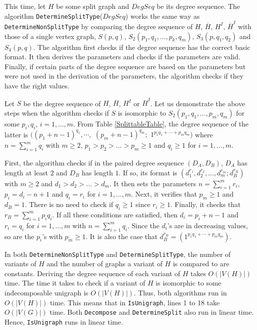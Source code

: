 \documentclass[11pt]{article}
\begin{document}
This time, let $H$ be some split  graph and $\mathit{DegSeq}$ be its degree sequence.  The algorithm {\tt DetermineSplitType}($\mathit{DegSeq}$) works the same way as {\tt DetermineNonSplitType} by comparing the degree sequence of $H$, $\overline{H}$, $H^I$, $\overline{H}^I$ with those of a single vertex graph, $S(p,q)$, $S_2(p_1, q_1, \hdots, p_k, q_m)$, $S_3(p, q_1, q_2)$ and $S_4(p,q)$.   The algorithm first checks if the degree sequence has the correct basic format.  It then derives the parameters and checks if the parameters are valid.  Finally, if certain parts of the degree sequence are based on the parameters but were not used in the derivation of the parameters,  the algorithm checks if they have the right values.  
 
 Let $S$ be the degree sequence of $H$, $\overline{H}$, $H^I$ or $\overline{H}^I$.  Let us demonstrate the above steps when the algorithm checks if $S$ is isomorphic to   $S_2(p_1, q_1, \hdots, p_m, q_m)$ for some $p_i, q_i$, $i = 1, \hdots, m$.  From Table \ref{SplittableTable}, the degree sequence of the latter is $((p_1+ n -1)^{q_1}, \cdots, $ $(p_m + n-1)^{q_m};$ $1^{p_1q_1 + \cdots + p_m q_m})$ where $n = \sum_{i=1}^m q_i$ with $m \ge 2$, $p_1 > p_2 > \hdots > p_m \ge 1$ and $q_i \ge 1$ for $i = 1, \hdots, m$.  
 
 First, the algorithm checks if in the paired degree sequence $(D_A, D_B)$,  $D_A$ has length at least $2$ and $D_B$ has length $1$.   If so, its format is  $(d_1^{r_1}, d_2^{r_2}, \dots, d_m^{r_m}; d_B^{r_B})$ with $m \ge 2$ and $d_1 > d_2 > \hdots > d_m$.  It then sets the parameters $n = \sum_{i=1}^m r_i$,  $p_i = d_i - n+1$ and $q_i = r_i$ for $i = 1, \hdots, m$.   Next, it verifies that $p_m \ge 1$ and $d_B = 1$.  There is no need to check if $q_i \ge 1$ since $r_i \ge 1$. 
 Finally, it checks that $r_B = \sum_{i=1}^m p_i q_i$.    If all these conditions are satisfied, then $d_i = p_i + n -1$ and $r_i = q_i$ for $i = 1, \hdots, m$ with $n = \sum_{i=1}^m q_i$.   Since the $d_i$'s are in decreasing values, so are the  $p_i$'s with $p_m \ge 1$.   It is also the case that $d_B^{r_B} = (1^{p_1q_1 + \cdots + p_m q_m})$. 
 
 
 In both {\tt DetermineNonSplitType} and {\tt DetermineSplitType}, the number of variants of $H$ and the number of graphs a variant of $H$ is compared to are constants.  Deriving the degree sequence of each variant of $H$ takes $O(|V(H)|)$ time. The time it takes to check if a variant of $H$ is isomorphic to some indecomposable unigraph is $O(|V(H)|)$.  Thus, both algorithms run in $O(|V(H)|)$ time.  This means that in {\tt IsUnigraph},  lines 1 to 18 take $O(|V(G)|)$ time.  Both {\tt Decompose} and {\tt DetermineSplit} also run in linear time.  Hence, {\tt IsUnigraph} runs in linear time.
 
 
\end{document}
